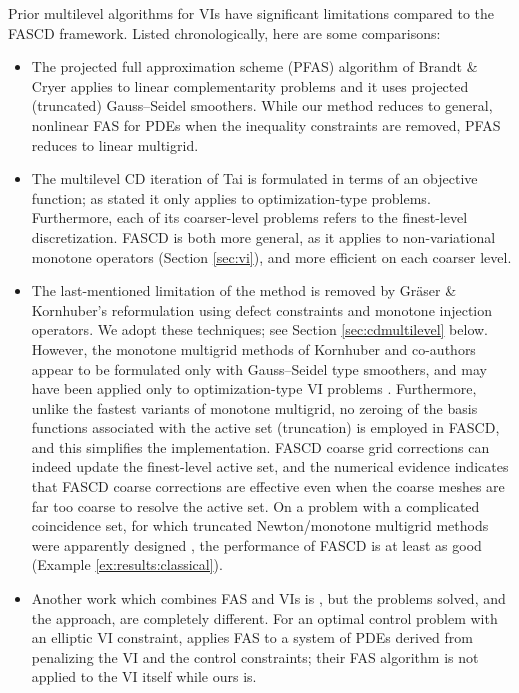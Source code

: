 \documentclass[review,hidelinks,onefignum,onetabnum,final]{siamart220329}  %
\begin{document}
Prior multilevel algorithms for VIs have significant limitations compared to the FASCD framework.  Listed chronologically, here are some comparisons:
\begin{itemize}
\item The projected full approximation scheme (PFAS) algorithm of Brandt \& Cryer \cite{BrandtCryer1983} applies to linear complementarity problems and it uses projected (truncated) Gauss--Seidel smoothers.  While our method reduces to general, nonlinear FAS for PDEs when the inequality constraints are removed, PFAS reduces to linear multigrid.
\item The multilevel CD iteration of Tai \cite{Tai2003} is formulated in terms of an objective function; as stated it only applies to optimization-type problems.  Furthermore, each of its coarser-level problems refers to the finest-level discretization.  FASCD is both more general, as it applies to non-variational monotone operators (Section \ref{sec:vi}), and more efficient on each coarser level.
\item The last-mentioned limitation of the \cite{Tai2003} method is removed by Gr\"aser \& Kornhuber's \cite[Algorithm 4.2]{GraeserKornhuber2009} reformulation using defect constraints and monotone injection operators.  We adopt these techniques; see Section \ref{sec:cdmultilevel} below.  However, the monotone multigrid methods of Kornhuber and co-authors \cite{GraeserKornhuber2009,Kornhuber1994} appear to be formulated only with Gauss--Seidel type smoothers, and may have been applied only to optimization-type VI problems \cite[for example]{JouvetGraeser2013}.  Furthermore, unlike the fastest variants of monotone multigrid, no zeroing of the basis functions associated with the active set (truncation) is employed in FASCD, and this simplifies the implementation.  FASCD coarse grid corrections can indeed update the finest-level active set, and the numerical evidence indicates that FASCD coarse corrections are effective even when the coarse meshes are far too coarse to resolve the active set.  On a problem with a complicated coincidence set, for which truncated Newton/monotone multigrid methods were apparently designed \cite[problem 7.1.1]{GraeserKornhuber2009}, the performance of FASCD is at least as good (Example \ref{ex:results:classical}).
\item Another work which combines FAS and VIs is \cite{HintermullerKopacka2011}, but the problems solved, and the approach, are completely different.  For an optimal control problem with an elliptic VI constraint, \cite{HintermullerKopacka2011} applies FAS to a system of PDEs derived from penalizing the VI and the control constraints; their FAS algorithm is not applied to the VI itself while ours is.
\end{itemize}
\end{document}
